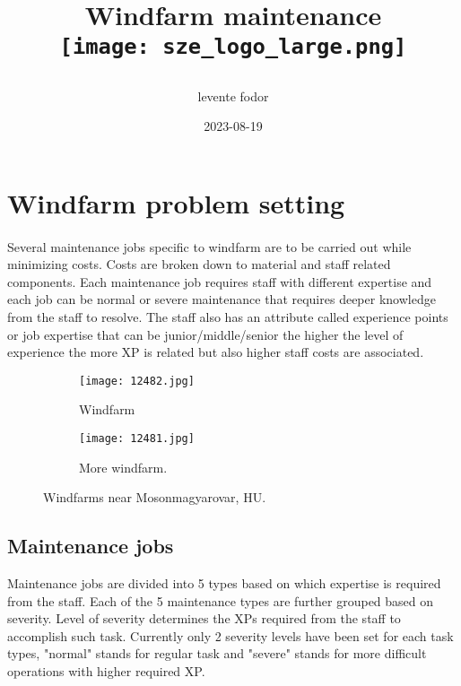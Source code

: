\documentclass[12p,a4paper,twoside]{article}
\title{ {Windfarm maintenance}\\
  \text{ }
  \texttt{[image: sze\_logo\_large.png]}
  \date{2023-08-19}
  \author{levente fodor}
}
\begin{document}
  \maketitle
  \newpage

  \tableofcontents
  \listoffigures
  
  \newpage

  \section{Windfarm problem setting}
    \paragraph{}
      Several maintenance jobs specific to windfarm are to be carried out while minimizing costs. 
      Costs are broken down to material and staff related components. Each maintenance job 
      requires staff with different expertise and each job can be normal or severe maintenance 
      that requires deeper knowledge from the staff to resolve. The staff also has an attribute 
      called experience points or job expertise that can be junior/middle/senior the higher 
      the level of experience the more XP is related but also higher staff costs are associated.

      \begin{figure}[h!]
        \centering
        \begin{subfigure}[b]{0.4\textwidth}
          \centering
          \texttt{[image: 12482.jpg]}
          \caption{Windfarm}
          \label{fig:Windfarm}
        \end{subfigure}
        \hfill
        \begin{subfigure}[b]{0.4\textwidth}
          \texttt{[image: 12481.jpg]}
          \caption{More windfarm.}
          \label{fig:More windfarm}
        \end{subfigure}
        \caption{Windfarms near Mosonmagyarovar, HU.}
      \end{figure}

      \subsection{Maintenance jobs}
        Maintenance jobs are divided into 5 types based on which expertise is required from the staff. 
        Each of the 5 maintenance types are further grouped based on severity. Level of severity 
        determines the XPs required from the staff to accomplish such task. Currently only 
        2 severity levels have been set for each task types, "normal" stands for regular task 
        and "severe" stands for more difficult operations with higher required XP.
\end{document}
